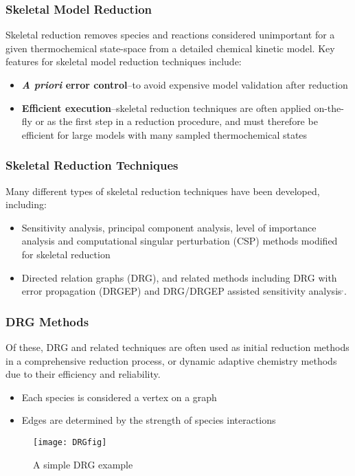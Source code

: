 \documentclass{beamer}
\newcounter{drgmethods}
\newcommand\DRGMethodsTitle{%
  \frametitle{\refstepcounter{drgmethods}DRG Methods~\thedrgmethods}}
\begin{document}
\begin{frame}
 \frametitle{Skeletal Model Reduction}
 Skeletal reduction removes species and reactions considered unimportant for a given thermochemical state-space from a detailed chemical kinetic model.
 Key features for skeletal model reduction techniques include:
 \begin{itemize}
  \item \textbf{\textit{A priori} error control}--to avoid expensive model validation after reduction
  \item \textbf{Efficient execution}--skeletal reduction techniques are often applied on-the-fly or as the first step in a reduction procedure, and must therefore be efficient for large models with many sampled thermochemical states
 \end{itemize}
\end{frame}
\begin{frame}
 \frametitle{Skeletal Reduction Techniques}
 Many different types of skeletal reduction techniques have been developed, including:
 \begin{itemize}
  \item Sensitivity analysis, principal component analysis, level of importance analysis and computational singular perturbation (CSP) methods modified for skeletal reduction
  \item Directed relation graphs (DRG), and related methods including DRG with error propagation (DRGEP) and DRG\slash DRGEP assisted sensitivity analysis$^{,}$.
 \end{itemize}
\end{frame}
\begin{frame}
 \DRGMethodsTitle
 Of these, DRG and related techniques are often used as initial reduction methods in a comprehensive reduction process, or dynamic adaptive chemistry methods due to their efficiency and reliability.
 \begin{itemize}
  \item Each species is considered a vertex on a graph
  \item Edges are determined by the strength of species interactions
 \end{itemize}
 \centering
  \begin{figure}
    \texttt{[image: DRGfig]}
    \caption{A simple DRG example}
  \end{figure}
\end{frame}
\end{document}
